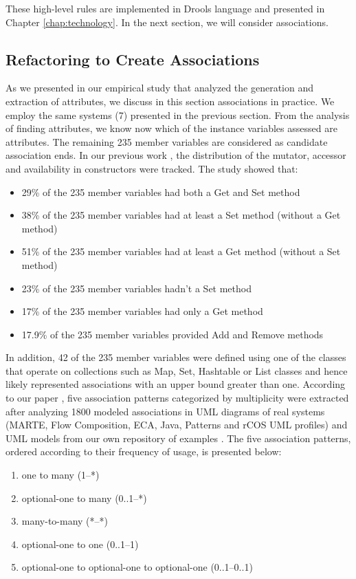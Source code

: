 These high-level rules are implemented in Drools language and presented in Chapter \ref{chap:technology}.
In the next section, we will consider associations. 

\subsection{Refactoring to Create Associations}

As we presented in our empirical study that analyzed the generation and extraction of attributes, we discuss in this section associations in practice. We employ the same systems (7) presented in the previous section. From the analysis of finding attributes, we know now which of the instance variables assessed are attributes. The remaining 235 member variables are considered as candidate association ends. In our previous work \cite{UmpleAssociations}, the distribution of the mutator, accessor and availability in constructors were tracked. The study showed that:

\begin{itemize}
\item 29\% of the 235 member variables had both a Get and Set method
\item 38\% of the 235 member variables had at least a Set method (without a Get method)
\item 51\% of the 235 member variables had at least a Get method (without a Set method)
\item 23\% of the 235 member variables hadn't a Set method
\item 17\% of the 235 member variables had only a Get method
\item 17.9\% of the 235 member variables provided Add and Remove methods
\end{itemize}

In addition, 42 of the 235 member variables were defined using one of the classes that operate on collections such as Map, Set, Hashtable or List classes and hence likely represented associations with an upper bound greater than one. According to our paper \cite{UmpleAssociations}, five association patterns categorized by multiplicity were extracted after analyzing 1800 modeled associations in UML diagrams of real systems (MARTE, Flow Composition, ECA, Java, Patterns and rCOS UML profiles) and UML models from our own repository of examples \cite{umpleexamples}. The five association patterns, ordered according to their frequency of usage, is presented below:

\begin{enumerate}
\item one to many (1--*)
\item optional-one to many (0..1--*)
\item many-to-many (*--*)
\item optional-one to one (0..1--1)
\item optional-one to optional-one to optional-one (0..1--0..1)
\end{enumerate}

